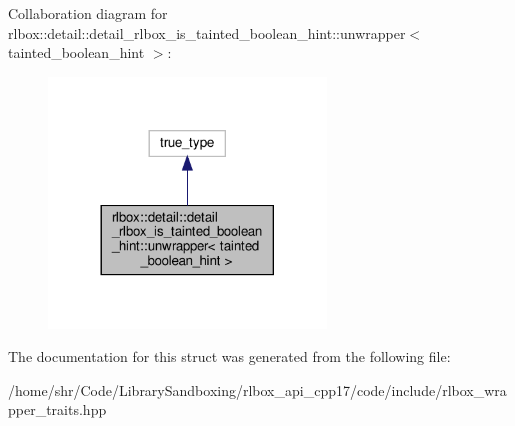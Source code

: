 Collaboration diagram for rlbox\+:\+:detail\+:\+:detail\+\_\+rlbox\+\_\+is\+\_\+tainted\+\_\+boolean\+\_\+hint\+:\+:unwrapper$<$ tainted\+\_\+boolean\+\_\+hint $>$\+:
\nopagebreak
\begin{figure}[H]
\begin{center}
\leavevmode
\includegraphics[width=209pt]{structrlbox_1_1detail_1_1detail__rlbox__is__tainted__boolean__hint_1_1unwrapper_3_01tainted__boolean__hint_01_4__coll__graph}
\end{center}
\end{figure}


The documentation for this struct was generated from the following file\+:\begin{DoxyCompactItemize}
\item 
/home/shr/\+Code/\+Library\+Sandboxing/rlbox\+\_\+api\+\_\+cpp17/code/include/rlbox\+\_\+wrapper\+\_\+traits.\+hpp\end{DoxyCompactItemize}
